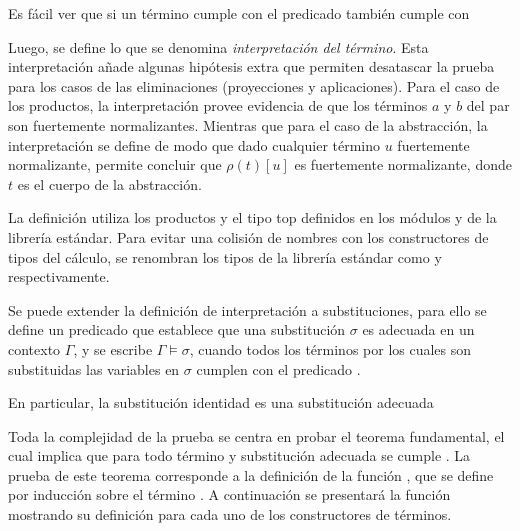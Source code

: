 
Es fácil ver que si un término cumple con el predicado  también cumple con 


Luego, se define lo que se denomina \textit{interpretación del término}.
Esta interpretación añade algunas hipótesis extra que permiten desatascar la prueba para los casos de las eliminaciones (proyecciones y aplicaciones).
Para el caso de los productos, la interpretación provee evidencia de que los términos $a$ y $b$ del par son fuertemente normalizantes.
Mientras que para el caso de la abstracción, la interpretación se define de modo que dado cualquier término $u$ fuertemente normalizante, permite concluir que $\rho (t) [u]$ es fuertemente normalizante, donde $t$ es el cuerpo de la abstracción.
 

La definición utiliza los productos \func{$\_\times\_$} y el tipo top \type{$\top$} definidos en los módulos  y  de la librería estándar.
Para evitar una colisión de nombres con los constructores de tipos del cálculo, se renombran los tipos de la librería estándar como \func{$\_\otimes\_$} y  respectivamente.

Se puede extender la definición de interpretación a substituciones, para ello se define un predicado que establece que una substitución $\sigma$ es adecuada en un contexto $\Gamma$, y se escribe $\Gamma \vDash \sigma$, cuando todos los términos por los cuales son substituidas las variables en $\sigma$ cumplen con el predicado \snstar.


En particular, la substitución identidad  es una substitución adecuada


Toda la complejidad de la prueba se centra en probar el teorema fundamental, el cual implica que para todo término  y substitución adecuada  se cumple
\snstar{}.
La prueba de este teorema corresponde a la definición de la función , que se define por inducción sobre el término .
A continuación se presentará la función mostrando su definición para cada uno de los constructores de términos.

